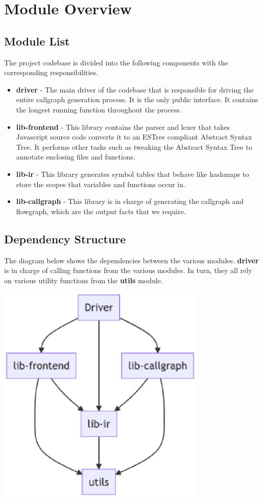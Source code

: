 \section{Module Overview}

\subsection{Module List}
The project codebase is divided into the following components with the corresponding responsibilities.

\begin{itemize}
    \item \textbf{driver} - The main driver of the codebase that is responsible for driving the entire callgraph generation process. It is the only public interface. It contains the longest running function throughout the process.
    \item \textbf{lib-frontend} - This library contains the parser and lexer that takes Javascript source code converts it to an ESTree\parencite{estree} compliant Abstract Syntax Tree. It performs other tasks such as tweaking the Abstract Syntax Tree to annotate enclosing files and functions. 
    \item \textbf{lib-ir} - This library generates symbol tables that behave like hashmaps to store the scopes that variables and functions occur in.
    \item \textbf{lib-callgraph} - This library is in charge of generating the callgraph and flowgraph, which are the output facts that we require.
\end{itemize}

\subsection{Dependency Structure}

The diagram below shows the dependencies between the various modules. \textbf{driver} is in charge of calling functions from the various modules. In turn, they all rely on various utility functions from the \textbf{utils} module.

\begin{center}
    \includegraphics[height=300pt]{./images/dependency.eps}
\end{center}

